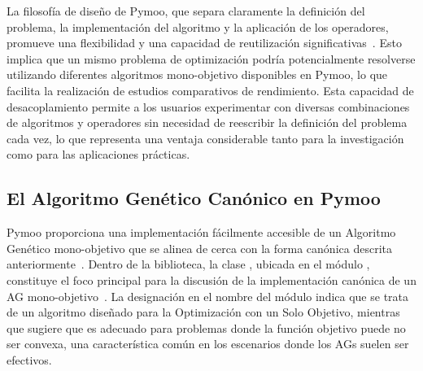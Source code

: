 La filosofía de diseño de Pymoo, que separa claramente la definición del problema, la implementación del algoritmo y la aplicación de los operadores, promueve una flexibilidad y una capacidad de reutilización significativas~\cite{blank2020}. Esto implica que un mismo problema de optimización podría potencialmente resolverse utilizando diferentes algoritmos mono-objetivo disponibles en Pymoo, lo que facilita la realización de estudios comparativos de rendimiento. Esta capacidad de desacoplamiento permite a los usuarios experimentar con diversas combinaciones de algoritmos y operadores sin necesidad de reescribir la definición del problema cada vez, lo que representa una ventaja considerable tanto para la investigación como para las aplicaciones prácticas.

\subsection{El Algoritmo Genético Canónico en Pymoo}

Pymoo proporciona una implementación fácilmente accesible de un Algoritmo Genético mono-objetivo que se alinea de cerca con la forma canónica descrita anteriormente~\cite{goldberg1989}. Dentro de la biblioteca, la clase \texttt{}, ubicada en el módulo \texttt{}, constituye el foco principal para la discusión de la implementación canónica de un AG mono-objetivo~\cite{blank2020}. La designación \texttt{} en el nombre del módulo indica que se trata de un algoritmo diseñado para la Optimización con un Solo Objetivo, mientras que \texttt{} sugiere que es adecuado para problemas donde la función objetivo puede no ser convexa, una característica común en los escenarios donde los AGs suelen ser efectivos.

